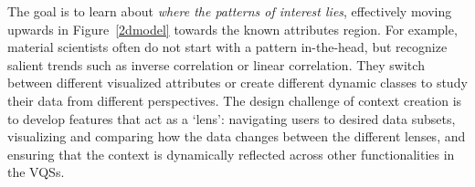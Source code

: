 The goal is to learn about \textit{where the patterns of interest lies}, effectively moving upwards in Figure~\ref{2dmodel} towards the known attributes region. For example, material scientists often do not start with a pattern in-the-head, but recognize salient trends such as inverse correlation or linear correlation. They switch between different visualized attributes or create different dynamic classes to study their data from different perspectives. The design challenge of context creation is to develop features that act as a `lens': navigating users to desired data subsets, visualizing and comparing how the data changes between the different lenses, and ensuring that the context is dynamically reflected across other functionalities in the VQSs.



